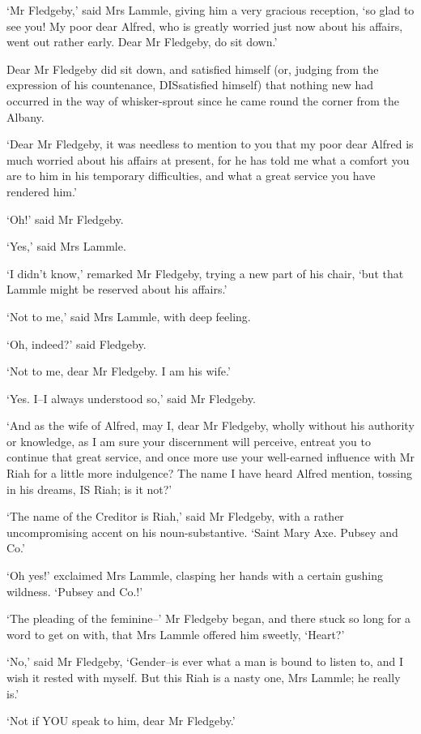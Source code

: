 ‘Mr Fledgeby,’ said Mrs Lammle, giving him a very gracious reception,
‘so glad to see you! My poor dear Alfred, who is greatly worried just
now about his affairs, went out rather early. Dear Mr Fledgeby, do sit
down.’

Dear Mr Fledgeby did sit down, and satisfied himself (or, judging from
the expression of his countenance, DISsatisfied himself) that nothing
new had occurred in the way of whisker-sprout since he came round the
corner from the Albany.

‘Dear Mr Fledgeby, it was needless to mention to you that my poor dear
Alfred is much worried about his affairs at present, for he has told me
what a comfort you are to him in his temporary difficulties, and what a
great service you have rendered him.’

‘Oh!’ said Mr Fledgeby.

‘Yes,’ said Mrs Lammle.

‘I didn’t know,’ remarked Mr Fledgeby, trying a new part of his chair,
‘but that Lammle might be reserved about his affairs.’

‘Not to me,’ said Mrs Lammle, with deep feeling.

‘Oh, indeed?’ said Fledgeby.

‘Not to me, dear Mr Fledgeby. I am his wife.’

‘Yes. I--I always understood so,’ said Mr Fledgeby.

‘And as the wife of Alfred, may I, dear Mr Fledgeby, wholly without his
authority or knowledge, as I am sure your discernment will perceive,
entreat you to continue that great service, and once more use your
well-earned influence with Mr Riah for a little more indulgence? The
name I have heard Alfred mention, tossing in his dreams, IS Riah; is it
not?’

‘The name of the Creditor is Riah,’ said Mr Fledgeby, with a rather
uncompromising accent on his noun-substantive. ‘Saint Mary Axe. Pubsey
and Co.’

‘Oh yes!’ exclaimed Mrs Lammle, clasping her hands with a certain
gushing wildness. ‘Pubsey and Co.!’

‘The pleading of the feminine--’ Mr Fledgeby began, and there stuck so
long for a word to get on with, that Mrs Lammle offered him sweetly,
‘Heart?’

‘No,’ said Mr Fledgeby, ‘Gender--is ever what a man is bound to listen
to, and I wish it rested with myself. But this Riah is a nasty one, Mrs
Lammle; he really is.’

‘Not if YOU speak to him, dear Mr Fledgeby.’

